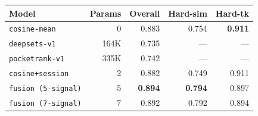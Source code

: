 \begin{tabular}{lrrrr}
\toprule
Model & Params & Overall & Hard-sim & Hard-tk \\
\midrule
\texttt{cosine-mean} & 0 & 0.883 & 0.754 & \textbf{0.911} \\
\texttt{deepsets-v1} & 164K & 0.735 & --- & --- \\
\texttt{pocketrank-v1} & 335K & 0.742 & --- & --- \\
\midrule
\texttt{cosine+session} & 2 & 0.882 & 0.749 & 0.911 \\
\texttt{fusion (5-signal)} & 5 & \textbf{0.894} & \textbf{0.794} & 0.897 \\
\texttt{fusion (7-signal)} & 7 & 0.892 & 0.792 & 0.894 \\
\bottomrule
\end{tabular}

